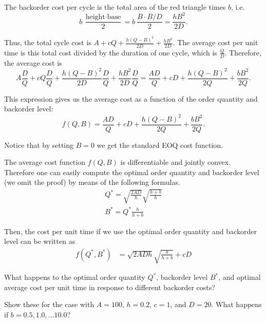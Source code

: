 \begin{solution}
The backorder cost per cycle is the total area of the red triangle times $b$, i.e. 
\begin{equation*}
b~\frac{\text{height}\cdot\text{base}}{2} = b~\frac{B \cdot B/D}{2} = \frac{hB^2}{2D}.
\end{equation*}

Thus, the total cycle cost is $A+cQ+\frac{h(Q-B)^2}{2D}+\frac{hB^2}{2D}$. The average cost per unit time is this total cost divided by the duration of one cycle, which is $\frac{Q}{D}$. Therefore, the average cost is
\begin{equation*}
A \frac{D}{Q}+cQ \frac{D}{Q} + \frac{h(Q-B)^2}{2D} \frac{D}{Q} + \frac{hB^2}{2D} \frac{D}{Q} = \frac{AD}{Q}+cD+\frac{h(Q-B)^2}{2Q} + \frac{bB^2}{2Q}.
\end{equation*}

This expression gives us the average cost as a function of the order quantity and backorder level:
\begin{equation*}
f(Q,B) = \frac{AD}{Q}+cD+\frac{h(Q-B)^2}{2Q} + \frac{bB^2}{2Q}.
\end{equation*}

Notice that by setting $B=0$ we get the standard EOQ cost function.

The average cost function $f(Q,B)$ is differentiable and jointly convex. Therefore one can easily compute the optimal order quantity and backorder level (we omit the proof) by means of the following formulas.
\begin{align*}
Q^* = \sqrt{\frac{2AD}{h}} \sqrt{\frac{h+b}{b}} \\
B^* = Q^* \frac{h}{h+b} 
\end{align*}

Then, the cost per unit time if we use the optimal order quantity and backorder level can be written as 
\begin{align*}
f(Q^*,B^*) 
& = \sqrt{2ADh} \sqrt{\frac{b}{h+b}} + cD
\end{align*}
\end{solution}


\begin{question}
What happens to the optimal order quantity $Q^*$, backorder level $B^*$, and optimal average cost per unit time in response to different backorder costs? 

Show these for the case with $A=100$, $h=0.2$, $c=1$, and $D=20$. What
  happens if $b=0.5,1.0,\ldots 10.0$?

\end{question}


